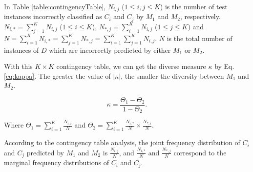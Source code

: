 \documentclass[acmsmall]{acmart}
\begin{document}
\begin{table}[!h]
	\caption{The $K\times K$ Contingency Table of Two Learning Models}\label{table:contingencyTable}
	\centering
\end{table}

In Table \ref{table:contingencyTable}, $N_{i,j}$ ($1\leq i, j\leq
K$) is the number of test instances incorrectly classified as $C_i$
and $C_j$ by $M_1$ and $M_2$, respectively. $N_{i,*} =
\sum_{j = 1}^{K}N_{i,j}$ ($1\leq i\leq K$), $N_{*,j} =
\sum_{i = 1}^{K}N_{i,j}$ ($1\leq j\leq K$) and $N =
\sum_{i=1}^{K}N_{i,*} = \sum_{j=1}^{K}N_{*,j} =
\sum_{i=1}^{K}\sum_{j=1}^{K}N_{i,j}$. $N$ is the total
number of instances of $D$ which are incorrectly predicted by either
$M_1$ or $M_2$.

With this $K\times K$ contingency table, we can get the diverse
measure $\kappa$ by Eq. \ref{eq:kappa}. The greater the value of
$|\kappa|$, the smaller the diversity between $M_1$ and $M_2$.

\begin{equation}\label{eq:kappa}
\kappa = \frac{\Theta_1 - \Theta_2}{1 - \Theta_{2}}.
\end{equation}

Where $\Theta_1 = \sum\limits_{i=1}^{K}\frac{N_{i,i}}{N}$ and
$\Theta_2 =
\sum\limits_{i=1}^{K}\frac{N_{i,*}}{N}\times\frac{N_{*,i}}{N}$.

According to the contingency table analysis, the joint frequency
distribution of $C_i$ and $C_j$ predicted by $M_1$ and $M_2$ is
$\frac{N_{i,j}}{N}$, and $\frac{N_{i,*}}{N}$ and $\frac{N_{*,j}}{N}$
correspond to the marginal frequency distributions of $C_i$ and
$C_j$.
\end{document}
